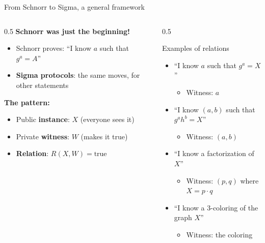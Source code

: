 \ifdefined\PRESENTATION\else\PassOptionsToClass{handout}{beamer}\fi\documentclass[aspectratio=169, lualatex]{beamer}
\begin{document}
\begin{frame}{From Schnorr to Sigma, a general framework}
	\begin{columns}[c]
		\begin{column}{0.5\textwidth}
			\textbf{Schnorr was just the beginning!}
			\begin{itemize}
				\item Schnorr proves: ``I know $a$ such that $g^a = A$''
				\item \textbf{Sigma protocols}: the same moves, for other statements
			\end{itemize}
			\textbf{The pattern:}
			\begin{itemize}
				\item Public \textbf{instance}: $X$ (everyone sees it)
				\item Private \textbf{witness}: $W$ (makes it true)
				\item \textbf{Relation}: $R(X, W) = \text{true}$
			\end{itemize}
		\end{column}
		\begin{column}{0.5\textwidth}
			\begin{exampleblock}{Examples of relations}
				\begin{itemize}
					\item ``I know $a$ such that $g^a = X$''
					      \begin{itemize}
						      \item Witness: $a$
					      \end{itemize}
					\item ``I know $(a, b)$ such that $g^a h^b = X$''
					      \begin{itemize}
						      \item Witness: $(a, b)$
					      \end{itemize}
					\item ``I know a factorization of $X$''
					      \begin{itemize}
						      \item Witness: $(p, q)$ where $X = p \cdot q$
					      \end{itemize}
					\item ``I know a 3-coloring of the graph $X$''
					      \begin{itemize}
						      \item Witness: the coloring
					      \end{itemize}
				\end{itemize}
			\end{exampleblock}
		\end{column}
	\end{columns}
\end{frame}
\end{document}
